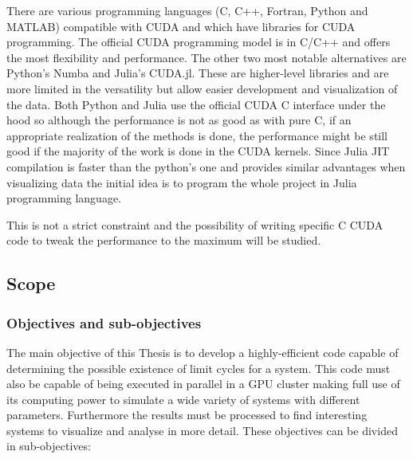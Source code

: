 There are various programming languages (C, C++, Fortran, Python and MATLAB) compatible with CUDA and which have libraries for CUDA programming. 
The official CUDA programming model is in C/C++ and offers the most flexibility and performance. The other two most notable alternatives are Python's Numba and Julia's CUDA.jl. 
These are higher-level libraries and 
are more limited in the versatility 
but allow easier development and visualization of the data.
Both Python and Julia use the official CUDA C interface under the hood so although the performance is not as good as with pure C, if an appropriate realization of the methods is done, the performance might be still good if the majority of the work is done in the CUDA kernels. Since Julia JIT compilation is faster than the python's one and provides similar advantages when visualizing data the initial idea is to program the whole project in Julia programming language.

This is not a strict constraint and the possibility of writing specific C CUDA code to tweak the performance to the maximum will be studied.


\subsection{Scope}
\subsubsection{Objectives and sub-objectives}

The main objective of this Thesis is to develop a highly-efficient code capable of determining the possible existence of limit cycles for a system. This code must also be capable of being executed in parallel in a GPU cluster making full use of its computing power to simulate a wide variety of systems with different parameters. Furthermore the results must be processed to find interesting
systems to visualize and analyse in more detail. These objectives can be divided in sub-objectives:

